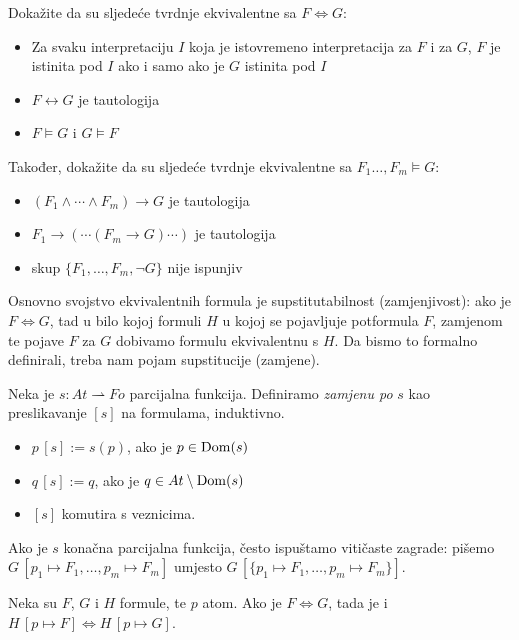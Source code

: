 \begin{zadatak}
Dokažite da su sljedeće tvrdnje ekvivalentne sa $F\Leftrightarrow G$:
\begin{itemize}
\item Za svaku interpretaciju $I$ koja je istovremeno interpretacija za $F$ i za $G$, $F$ je istinita pod $I$ ako i samo ako je $G$ istinita pod $I$
\item $F\leftrightarrow G$ je tautologija
\item $F\models G$ i $G\models F$
\end{itemize}
Također, dokažite da su sljedeće tvrdnje ekvivalentne sa $F_1\ldots,F_m\models G$:
\begin{itemize}
\item $(F_1\wedge\cdots\wedge F_m)\to G$ je tautologija
\item $F_1\to(\cdots(F_m\to G)\cdots)$ je tautologija
\item skup $\{F_1,\ldots,F_m,\neg G\}$ nije ispunjiv
\end{itemize}
\end{zadatak}

Osnovno svojstvo ekvivalentnih formula je supstitutabilnost (zamjenjivost): ako je $F\Leftrightarrow G$, tad u bilo kojoj formuli $H$ u kojoj se pojavljuje potformula $F$, zamjenom te pojave $F$ za $G$ dobivamo formulu ekvivalentnu s $H$. Da bismo to formalno definirali, treba nam pojam supstitucije (zamjene).

\begin{definicija}
Neka je $s:At\rightharpoonup Fo$ parcijalna funkcija. Definiramo \emph{zamjenu po} $s$ kao preslikavanje $[s]$ na formulama, induktivno.
\begin{itemize}
\item $p\,[s] := s(p)$, ako je $p\in\operatorname{Dom}(s)$
\item $q\,[s] := q$, ako je $q\in At\setminus\operatorname{Dom}(s)$
\item $[s]$ komutira s veznicima.
\end{itemize}
Ako je $s$ konačna parcijalna funkcija, često ispuštamo vitičaste zagrade: pišemo $G\,[p_1\mapsto F_1,\ldots, p_m\mapsto F_m]$ umjesto $G\,[\{p_1\mapsto F_1, \ldots, p_m\mapsto F_m\}]$.
\end{definicija}

\begin{teorem}
Neka su $F$, $G$ i $H$ formule, te $p$ atom. Ako je $F\Leftrightarrow G$, tada je i $H\,[p\mapsto F]\Leftrightarrow H\,[p\mapsto G]$.
\end{teorem}

